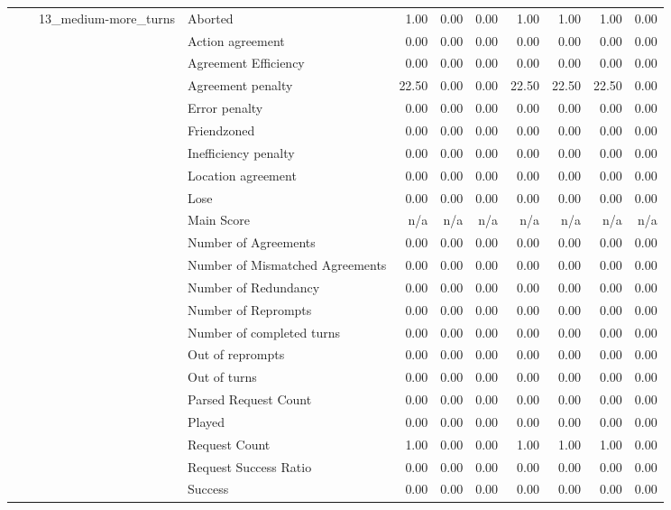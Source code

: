 \begin{tabular}{llllrrrrrrr}
\cline{3-11}
 &  & \multirow[t]{27}{*}{13_medium-more_turns} & Aborted & 1.00 & 0.00 & 0.00 & 1.00 & 1.00 & 1.00 & 0.00 \\
 &  &  & Action agreement & 0.00 & 0.00 & 0.00 & 0.00 & 0.00 & 0.00 & 0.00 \\
 &  &  & Agreement Efficiency & 0.00 & 0.00 & 0.00 & 0.00 & 0.00 & 0.00 & 0.00 \\
 &  &  & Agreement penalty & 22.50 & 0.00 & 0.00 & 22.50 & 22.50 & 22.50 & 0.00 \\
 &  &  & Error penalty & 0.00 & 0.00 & 0.00 & 0.00 & 0.00 & 0.00 & 0.00 \\
 &  &  & Friendzoned & 0.00 & 0.00 & 0.00 & 0.00 & 0.00 & 0.00 & 0.00 \\
 &  &  & Inefficiency penalty & 0.00 & 0.00 & 0.00 & 0.00 & 0.00 & 0.00 & 0.00 \\
 &  &  & Location agreement & 0.00 & 0.00 & 0.00 & 0.00 & 0.00 & 0.00 & 0.00 \\
 &  &  & Lose & 0.00 & 0.00 & 0.00 & 0.00 & 0.00 & 0.00 & 0.00 \\
 &  &  & Main Score & n/a & n/a & n/a & n/a & n/a & n/a & n/a \\
 &  &  & Number of Agreements & 0.00 & 0.00 & 0.00 & 0.00 & 0.00 & 0.00 & 0.00 \\
 &  &  & Number of Mismatched Agreements & 0.00 & 0.00 & 0.00 & 0.00 & 0.00 & 0.00 & 0.00 \\
 &  &  & Number of Redundancy & 0.00 & 0.00 & 0.00 & 0.00 & 0.00 & 0.00 & 0.00 \\
 &  &  & Number of Reprompts & 0.00 & 0.00 & 0.00 & 0.00 & 0.00 & 0.00 & 0.00 \\
 &  &  & Number of completed turns & 0.00 & 0.00 & 0.00 & 0.00 & 0.00 & 0.00 & 0.00 \\
 &  &  & Out of reprompts & 0.00 & 0.00 & 0.00 & 0.00 & 0.00 & 0.00 & 0.00 \\
 &  &  & Out of turns & 0.00 & 0.00 & 0.00 & 0.00 & 0.00 & 0.00 & 0.00 \\
 &  &  & Parsed Request Count & 0.00 & 0.00 & 0.00 & 0.00 & 0.00 & 0.00 & 0.00 \\
 &  &  & Played & 0.00 & 0.00 & 0.00 & 0.00 & 0.00 & 0.00 & 0.00 \\
 &  &  & Request Count & 1.00 & 0.00 & 0.00 & 1.00 & 1.00 & 1.00 & 0.00 \\
 &  &  & Request Success Ratio & 0.00 & 0.00 & 0.00 & 0.00 & 0.00 & 0.00 & 0.00 \\
 &  &  & Success & 0.00 & 0.00 & 0.00 & 0.00 & 0.00 & 0.00 & 0.00 \\

\end{tabular}
